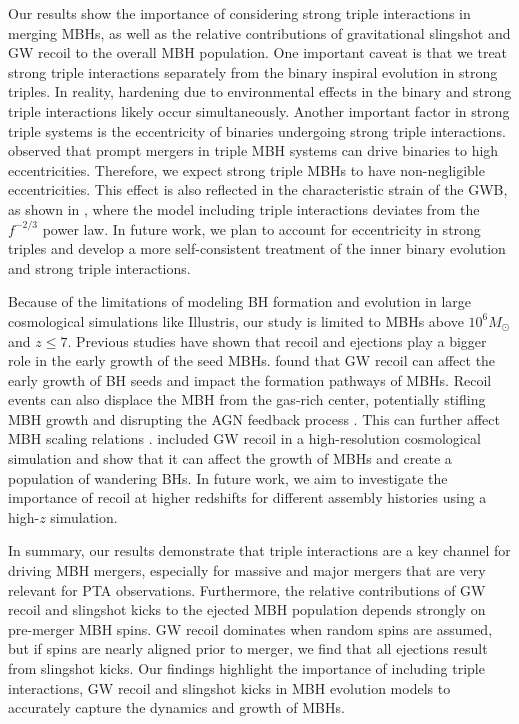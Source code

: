 \documentclass[twocolumn,linenumbers]{aastex701}
\begin{document}
Our results show the importance of considering strong triple interactions in merging MBHs, as well as the relative contributions of gravitational slingshot and GW recoil to the overall MBH population.  One important caveat is that we treat strong triple interactions separately from the binary inspiral evolution in strong triples. In reality, hardening due to environmental effects in the binary and strong triple interactions likely occur simultaneously. Another important factor in strong triple systems is the eccentricity of binaries undergoing strong triple interactions. \cite{bonetti_post-newtonian_2018-1} observed that prompt mergers in triple MBH systems can drive binaries to high eccentricities. Therefore, we expect strong triple MBHs to have non-negligible eccentricities. This effect is also reflected in the characteristic strain of the GWB, as shown in \cite{bonetti_post-newtonian_2018}, where the model including triple interactions deviates from the $f^{-2/3}$ power law. In future work, we plan to account for eccentricity in strong triples and develop a more self-consistent treatment of the inner binary evolution and strong triple interactions. 

Because of the limitations of modeling BH formation and evolution in large cosmological simulations like Illustris, our study is limited to MBHs above $10^6 M_{\odot}$ and $z\leq7$. Previous studies \citep{Volonteri_2007, Sesana_2007,dunn_role_2020} have shown that recoil and ejections play a bigger role in the early growth of the seed MBHs. \citet{dunn_role_2020} found that GW recoil can affect the early growth of BH seeds and impact the formation pathways of MBHs.  Recoil events can also displace the MBH from the gas-rich center, potentially stifling MBH growth and disrupting the AGN feedback process \citep{blecha_effects_2008}. This can further affect MBH scaling relations \citep{blecha_recoiling_2011}. \citet{dongpáez2024} included GW recoil in a high-resolution cosmological simulation and show that it can affect the growth of MBHs and create a population of wandering BHs. In future work, we aim to investigate the importance of recoil at higher redshifts for different assembly histories using a high-$z$ simulation.

In summary, our results demonstrate that triple interactions are a key channel for driving MBH mergers, especially for massive and major mergers that are very relevant for PTA observations. Furthermore, the relative contributions of GW recoil and slingshot kicks to the ejected MBH population depends strongly on pre-merger MBH spins. GW recoil dominates when random spins are assumed, but if spins are nearly aligned prior to merger, we find that all ejections result from slingshot kicks. Our findings highlight the importance of including triple interactions, GW recoil and slingshot kicks in MBH evolution models to accurately capture the dynamics and growth of MBHs. 
\end{document}

